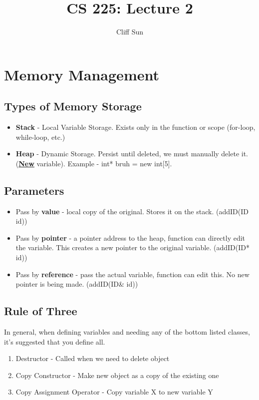 \documentclass{article}
\title{CS 225: Lecture 2}
\author{Cliff Sun}
\newtheorem{one minute paper}[theorem]{One Minute Paper}
\begin{document}
\maketitle

\section*{Memory Management}

\subsection*{Types of Memory Storage}
\begin{itemize}
    \item \textbf{Stack} - Local Variable Storage. Exists only in the function or scope (for-loop, while-loop, etc.)
    \item \textbf{Heap} - Dynamic Storage. Persist until deleted, we must manually delete it. (\textbf{\underline{New}} variable). Example - int* bruh = new int[5]. 
\end{itemize}

\subsection*{Parameters}

\begin{itemize}
    \item Pass by \textbf{value} - local copy of the original. Stores it on the stack. (addID(ID id))
    \item Pass by \textbf{pointer} - a pointer address to the heap, function can directly edit the variable. This creates a new pointer to the original variable. (addID(ID* id))
    \item Pass by \textbf{reference} - pass the actual variable, function can edit this. No new pointer is being made. (addID(ID\& id))
\end{itemize}

\subsection*{Rule of Three}
In general, when defining variables and needing any of the bottom listed classes, it's suggested that you define all. 
\begin{enumerate}
    \item Destructor - Called when we need to delete object
    \item Copy Constructor - Make new object as a copy of the existing one
    \item Copy Assignment Operator - Copy variable X to new variable Y
\end{enumerate}
\end{document}
